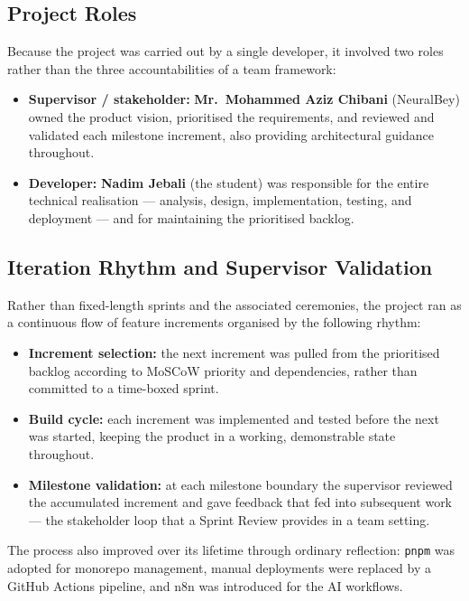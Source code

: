\documentclass[12pt, a4paper, oneside]{report}
\begin{document}
\subsection{Project Roles}

Because the project was carried out by a single developer, it involved
two roles rather than the three accountabilities of a team framework:

\begin{itemize}[leftmargin=*,itemsep=4pt]
  \item \textbf{Supervisor / stakeholder:} \textbf{Mr.\ Mohammed Aziz
        Chibani} (NeuralBey) owned the product vision, prioritised the
        requirements, and reviewed and validated each milestone
        increment, also providing architectural guidance throughout.
  \item \textbf{Developer:} \textbf{Nadim Jebali} (the student) was
        responsible for the entire technical realisation --- analysis,
        design, implementation, testing, and deployment --- and for
        maintaining the prioritised backlog.
\end{itemize}

\subsection{Iteration Rhythm and Supervisor Validation}

Rather than fixed-length sprints and the associated ceremonies, the
project ran as a continuous flow of feature increments organised by
the following rhythm:

\begin{itemize}[leftmargin=*,itemsep=4pt]
  \item \textbf{Increment selection:} the next increment was pulled
        from the prioritised backlog according to MoSCoW priority and
        dependencies, rather than committed to a time-boxed sprint.
  \item \textbf{Build cycle:} each increment was implemented and tested
        before the next was started, keeping the product in a working,
        demonstrable state throughout.
  \item \textbf{Milestone validation:} at each milestone boundary the
        supervisor reviewed the accumulated increment and gave feedback
        that fed into subsequent work --- the stakeholder loop that a
        Sprint Review provides in a team setting.
\end{itemize}

The process also improved over its lifetime through ordinary
reflection: \texttt{pnpm} was adopted for monorepo management, manual
deployments were replaced by a GitHub Actions pipeline, and n8n was
introduced for the AI workflows.
\end{document}
